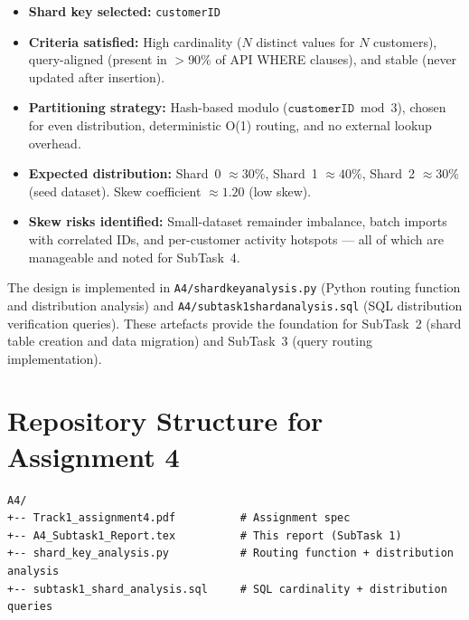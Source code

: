 \documentclass[12pt, a4paper]{article}
\renewcommand{\_}{\plainunderscore\allowbreak}
\begin{document}
\begin{itemize}[leftmargin=*]
  \item \textbf{Shard key selected:} \texttt{customerID}
  \item \textbf{Criteria satisfied:} High cardinality ($N$ distinct values
        for $N$ customers), query-aligned (present in $>$90\% of API
        WHERE clauses), and stable (never updated after insertion).
  \item \textbf{Partitioning strategy:} Hash-based modulo
        ($\texttt{customerID} \bmod 3$), chosen for even distribution,
        deterministic O(1) routing, and no external lookup overhead.
  \item \textbf{Expected distribution:} Shard~0 $\approx 30\%$,
        Shard~1 $\approx 40\%$, Shard~2 $\approx 30\%$ (seed dataset).
        Skew coefficient $\approx 1.20$ (low skew).
  \item \textbf{Skew risks identified:} Small-dataset remainder imbalance,
        batch imports with correlated IDs, and per-customer activity
        hotspots --- all of which are manageable and noted for SubTask~4.
\end{itemize}

The design is implemented in \texttt{A4/shard\_key\_analysis.py}
(Python routing function and distribution analysis) and
\texttt{A4/subtask1\_shard\_analysis.sql} (SQL distribution
verification queries). These artefacts provide the foundation for
SubTask~2 (shard table creation and data migration) and SubTask~3
(query routing implementation).

\appendix
\section{Repository Structure for Assignment 4}

\begin{verbatim}
A4/
+-- Track1_assignment4.pdf          # Assignment spec
+-- A4_Subtask1_Report.tex          # This report (SubTask 1)
+-- shard_key_analysis.py           # Routing function + distribution analysis
+-- subtask1_shard_analysis.sql     # SQL cardinality + distribution queries
\end{verbatim}
\end{document}
